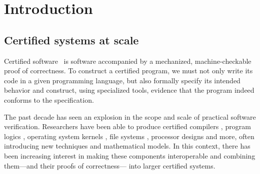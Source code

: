 \documentclass[draft,11pt]{report}
\theoremstyle{definition}
\begin{document}
\begin{abstract}



\end{abstract}

\tableofcontents

\chapter{Introduction} %

\section{Certified systems at scale} %
\label{ssec:certsys}


Certified software~\citep{shao10}
is software accompanied by
a mechanized, machine-checkable proof of correctness.
To construct a certified program,
we must not only write its code in a given programming language,
but also formally specify its intended behavior
and construct, using specialized tools,
evidence that the program
indeed conforms to the specification.


The past decade has seen an explosion
in the scope and scale of practical software verification.
Researchers have been able to produce certified
compilers \citep{compcert},
program logics \citep{vst},
operating system kernels \citep{sel4,popl15},
file systems \citep{fscq},
processor designs \citep{safe,kami} and more,
often introducing new techniques
and mathematical models.
In this context,
there has been increasing interest in
making these components
interoperable and
combining them---and their proofs of correctness---%
into larger certified systems.
\end{document}
